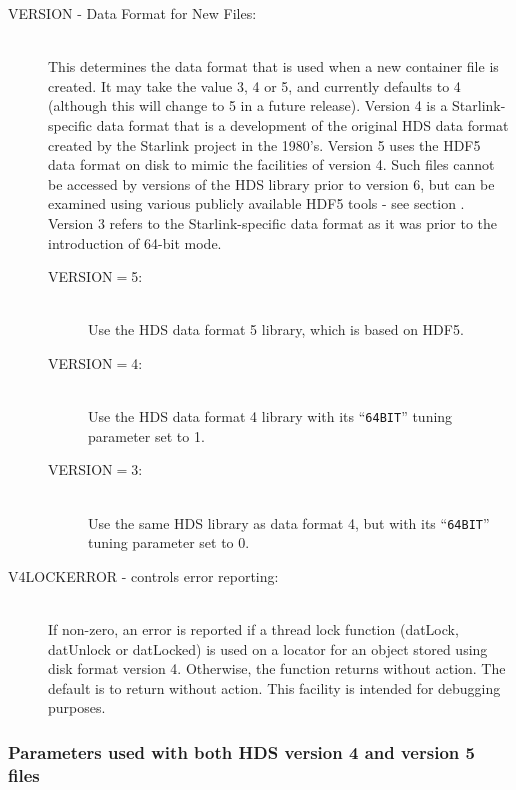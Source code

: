 \documentclass[twoside,11pt]{starlink}
\begin{document}
\begin{description}

\item [VERSION - Data Format for New Files:]\mbox{}\\
This determines the data format that is used when a new container file is
created. It may take the value 3, 4 or 5, and currently defaults to 4
(although this will change to 5 in a future release). Version 4 is a
Starlink-specific data format that is a development of the original HDS
data format created by the Starlink project in the 1980's. Version 5 uses
the HDF5 data format on disk to mimic the facilities of version 4. Such
files cannot be accessed by versions of the HDS library prior to version
6, but can be examined using various publicly available HDF5 tools - see
section .  Version 3 refers
to the Starlink-specific data format as it was prior to the introduction of
64-bit mode.

\begin{description}
\item[VERSION$=$5:]\mbox{}\\
Use the HDS data format 5 library, which is based on HDF5.

\item[VERSION$=$4:]\mbox{}\\
Use the HDS data format 4 library with its
``\texttt{64BIT}'' tuning parameter set to 1.

\item[VERSION$=$3:]\mbox{}\\
Use the same HDS library as data format 4, but with its
``\texttt{64BIT}'' tuning parameter set to 0.
\end{description}

\item [V4LOCKERROR - controls error reporting:]\mbox{}\\
If non-zero, an error is reported if a thread lock function (datLock,
datUnlock or datLocked) is used on a locator for an object stored using
disk format version 4. Otherwise, the function returns without action.
The default is to return without action. This facility is intended for
debugging purposes.

\end{description}

\subsubsection*{Parameters used with both HDS version 4 and version 5 files}
\end{document}
